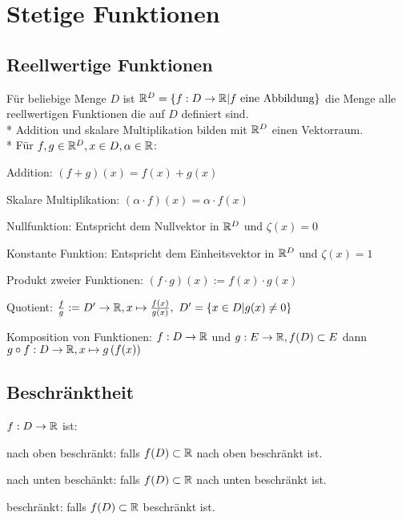 
\section{Stetige Funktionen}
\subsection{Reellwertige Funktionen}
Für beliebige Menge $D$ ist $\mathbb{R}^D = \{f : D \to \mathbb{R} | f \text{ eine Abbildung}\}$ die Menge alle reellwertigen Funktionen die auf $D$ definiert sind.\\*
Addition und skalare Multiplikation bilden mit $\mathbb{R}^D$ einen Vektorraum.\\*
Für $f, g \in \mathbb{R}^D, x \in D, \alpha \in \mathbb{R}$:
\begin{compactdesc}
    \item[Addition:] $(f + g)(x) = f(x) + g(x)$
    \item[Skalare Multiplikation:] $\left( \alpha \cdot f \right) (x) = \alpha \cdot f(x)$
    \item[Nullfunktion:] Entspricht dem Nullvektor in $\mathbb{R}^D$ und $\zeta(x) = 0$
    \item[Konstante Funktion:]  Entspricht dem Einheitsvektor in $\mathbb{R}^D$ und $\zeta(x) = 1$
    \item[Produkt zweier Funktionen:] $(f \cdot g)(x) := f(x) \cdot g(x)$
    \item[Quotient:] $\frac{f}{g} := D' \to \mathbb{R}, x \mapsto \frac{f(x)}{g(x)}, \ D'= \{x \in D | g(x) \neq 0\} $
    \item[Komposition von Funktionen:] $f: D \to \mathbb{R}$ und $g: E \to \mathbb{R}, f(D) \subset E$ dann $g \circ f: D \to \mathbb{R}, x \mapsto g\left( f(x) \right)$
\end{compactdesc}

\subsection{Beschränktheit}
$f : D \to \mathbb{R}$ ist:
\begin{compactdesc}
    \item[nach oben beschränkt:] falls $f(D) \subset \mathbb{R}$ nach oben beschränkt ist.
    \item[nach unten beschänkt:] falls $f(D) \subset \mathbb{R}$ nach unten beschränkt ist.
    \item[beschränkt:] falls $f(D) \subset \mathbb{R}$ beschränkt ist.
\end{compactdesc}

